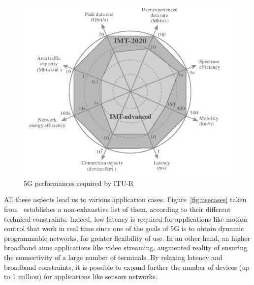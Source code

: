 \documentclass[a4paper,10pt]{article}
\begin{document}
  \begin{figure}[h]
      \begin{center}
      \includegraphics[width=1\textwidth]{5Grequirements}
      \end{center}
      \caption{5G performances required by ITU-R}\label{fig:5gperf}
      \end{figure}

All these aspects lead us to various application cases. Figure~\ref{fig:usecases} taken from~\cite{5GACIA} establishes a non-exhaustive list of them, according to their different technical constraints. Indeed, low latency is required for applications like motion control that work in real time since one of the goals of 5G is to obtain dynamic programmable networks, for greater flexibility of use.
 In an other hand, an higher broadband aims applications like video streaming, augmented reality of ensuring the connectivity of a large number of terminals.
By relaxing latency and broadband constraints, it is possible to expand further the number of devices (up to 1 million) for applications like sensors networks.
\end{document}
